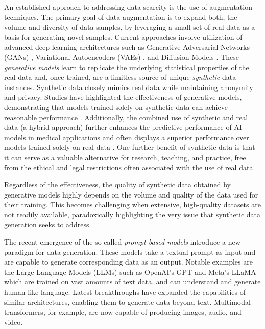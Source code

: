 \documentclass[runningheads]{llncs}
\begin{document}
An established approach to addressing data scarcity is the use of augmentation techniques. The primary goal of data augmentation is to expand both, the volume and diversity of data samples, by leveraging a small set of real data as a basis for generating novel samples. Current approaches involve utilization of advanced deep learning architectures such as Generative Adversarial Networks (GANs) \cite{goodfellow2014}, Variational Autoencoders (VAEs) \cite{kingma2013,rezende2014}, and Diffusion Models \cite{Ho2020}. These \emph{generative models} learn to replicate the underlying statistical properties of the real data and, once trained, are a limitless source of unique \textit{synthetic} data instances. Synthetic data closely mimics real data while maintaining anonymity and privacy. Studies have highlighted the effectiveness of generative models, demonstrating that models trained solely on synthetic data can achieve reasonable performance \cite{Carrle2023}. Additionally, the combined use of synthetic and real data (a hybrid approach) further enhances the predictive performance of AI models in medical applications and often displays a superior performance over models trained solely on real data \cite{Xu2024PracticalAO,Frid_Adar_2018,Dorjsembe2024}.
One further benefit of synthetic data is that it can serve as a valuable alternative for research, teaching, and practice, free from the ethical and legal restrictions often associated with the use of real data. 

Regardless of the effectiveness, the quality of synthetic data obtained by generative models highly depends on the volume and quality of the data used for their training. This becomes challenging when extensive, high-quality datasets are not readily available, paradoxically highlighting the very issue that synthetic data generation seeks to address.

The recent emergence of the so-called \textit{prompt-based models} introduce a new paradigm for data generation. These models take a textual prompt as input and are capable to generate corresponding data as an output. Notable examples are the Large Language Models (LLMs) \cite{minaee2024} such as OpenAI's GPT \cite{openai2023gpt4} and Meta’s LLaMA \cite{meta2023llama} which are trained on vast amounts of text data, and can understand and generate human-like language. Latest breakthroughs have expanded the capabilities of similar architectures, enabling them to generate data beyond text. Multimodal transformers, for example, are now capable of producing images, audio, and video.
\end{document}

